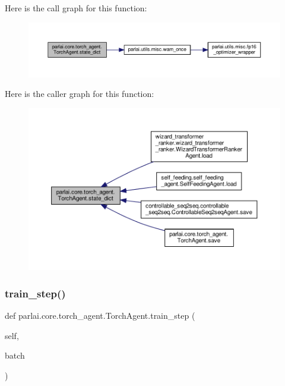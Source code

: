 Here is the call graph for this function\+:
\nopagebreak
\begin{figure}[H]
\begin{center}
\leavevmode
\includegraphics[width=350pt]{classparlai_1_1core_1_1torch__agent_1_1TorchAgent_a9f89e606931a4622a5c6a6f6b832235c_cgraph}
\end{center}
\end{figure}
Here is the caller graph for this function\+:
\nopagebreak
\begin{figure}[H]
\begin{center}
\leavevmode
\includegraphics[width=350pt]{classparlai_1_1core_1_1torch__agent_1_1TorchAgent_a9f89e606931a4622a5c6a6f6b832235c_icgraph}
\end{center}
\end{figure}
\mbox{\label{classparlai_1_1core_1_1torch__agent_1_1TorchAgent_a8ba9d535736c0af100d00c5e7b02b61b}} 
\subsubsection{\texorpdfstring{train\+\_\+step()}{train\_step()}}
{\footnotesize\ttfamily def parlai.\+core.\+torch\+\_\+agent.\+Torch\+Agent.\+train\+\_\+step (\begin{DoxyParamCaption}\item[{}]{self,  }\item[{}]{batch }\end{DoxyParamCaption})}

